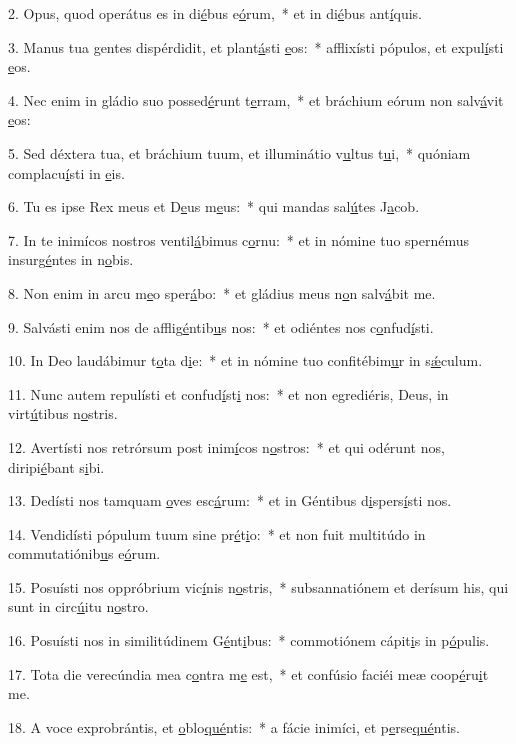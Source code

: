 2. Opus, quod operátus es in di\uline{é}bus e\uline{ó}rum,~* et in di\uline{é}bus ant\uline{í}quis.\par 
3. Manus tua gentes dispérdidit, et plant\uline{á}sti \uline{e}os:~* afflixísti pópulos, et expul\uline{í}sti \uline{e}os.\par 
4. Nec enim in gládio suo possed\uline{é}runt t\uline{e}rram,~* et bráchium eórum non salv\uline{á}vit \uline{e}os:\par 
5. Sed déxtera tua, et bráchium tuum, et illuminátio v\uline{u}ltus t\uline{u}i,~* quóniam complacu\uline{í}sti in \uline{e}is.\par 
6. Tu es ipse Rex meus et D\uline{e}us m\uline{e}us:~* qui mandas sal\uline{ú}tes J\uline{a}cob.\par 
7. In te inimícos nostros ventil\uline{á}bimus c\uline{o}rnu:~* et in nómine tuo spernémus insurg\uline{é}ntes in n\uline{o}bis.\par 
8. Non enim in arcu m\uline{e}o sper\uline{á}bo:~* et gládius meus n\uline{o}n salv\uline{á}bit me.\par 
9. Salvásti enim nos de afflig\uline{é}ntib\uline{u}s nos:~* et odiéntes nos c\uline{o}nfud\uline{í}sti.\par 
10. In Deo laudábimur t\uline{o}ta d\uline{i}e:~* et in nómine tuo confitébim\uline{u}r in s\uline{ǽ}culum.\par 
11. Nunc autem repulísti et confud\uline{í}st\uline{i} nos:~* et non egrediéris, Deus, in virt\uline{ú}tibus n\uline{o}stris.\par 
12. Avertísti nos retrórsum post inim\uline{í}cos n\uline{o}stros:~* et qui odérunt nos, diripi\uline{é}bant s\uline{i}bi.\par 
13. Dedísti nos tamquam \uline{o}ves esc\uline{á}rum:~* et in Géntibus d\uline{i}spers\uline{í}sti nos.\par 
14. Vendidísti pópulum tuum sine pr\uline{é}t\uline{i}o:~* et non fuit multitúdo in commutatiónib\uline{u}s e\uline{ó}rum.\par 
15. Posuísti nos oppróbrium vic\uline{í}nis n\uline{o}stris,~* subsannatiónem et derísum his, qui sunt in circ\uline{ú}itu n\uline{o}stro.\par 
16. Posuísti nos in similitúdinem G\uline{é}nt\uline{i}bus:~* commotiónem cápit\uline{i}s in p\uline{ó}pulis.\par 
17. Tota die verecúndia mea c\uline{o}ntra m\uline{e} est,~* et confúsio faciéi meæ coop\uline{é}ru\uline{i}t me.\par 
18. A voce exprobrántis, et \uline{o}blo\uline{qué}ntis:~* a fácie inimíci, et p\uline{e}rse\uline{qué}ntis.\par 
